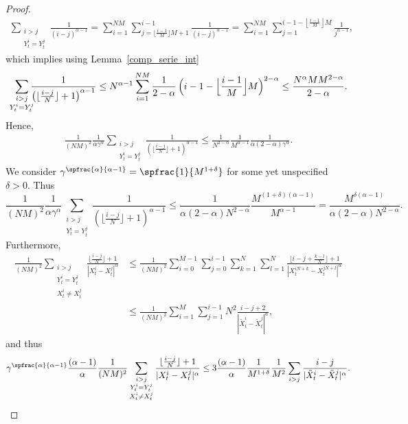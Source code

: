 \begin{proof}
\begin{gather*}
\tag*{and}
\sum_{\substack{i>j\\Y^i_t= Y^j_t}}\frac{1}{(i-j)^{\alpha-1}}=\sum_{i=1}^{NM}\sum_{j=\lfloor\frac{i-1}{M}\rfloor M+1}^{i-1}\frac{1}{(i-j)^{\alpha-1}}=\sum_{i=1}^{NM}\sum_{j=1}^{i-1-\left\lfloor\frac{i-1}{M}\right\rfloor M}\frac{1}{j^{\alpha-1}},
\end{gather*}
which implies using Lemma~\ref{comp_serie_int}\vspace*{-3pt}
\[
\sum_{\substack{i>j\\Y^i_t= Y^j_t}}\hspace*{-2mm}\frac{1}{\left(\lfloor\frac{i-j}{N}\rfloor+1\right)^{\alpha-1}}\leq N^{\alpha-1}\sum_{i=1}^{NM}\frac{1}{2-\alpha}\,\Bigl(i-1-\Bigl\lfloor\frac{i-1}{M}\Bigr\rfloor M\Bigr)^{2-\alpha}\leq \frac{N^\alpha MM^{2-\alpha}}{2-\alpha}.
\]
Hence,\vspace*{-5pt}
\begin{align*}
\frac{1}{(NM)^2}\frac{1}{\alpha\gamma^\alpha}\sum_{\substack{i>j\\Y^i_t= Y^j_t}}\frac{1}{\left(\lfloor\frac{i-j}{N}\rfloor+1\right)^{\alpha-1}}\leq\frac{1}{N^{2-\alpha}}\frac{1}{M^{\alpha-1}}\frac{1}{\alpha(2-\alpha)\gamma^\alpha}.
\end{align*}
We consider $\gamma^{\spfrac{\alpha}{\alpha-1}}=\spfrac{1}{M^{1+\delta}}$ for some yet unspecified $\delta>0$. Thus\vspace*{-3pt}
\[
\frac{1}{(NM)^2}\frac{1}{\alpha\gamma^\alpha}\sum_{\substack{i>j\\Y^i_t= Y^j_t}}\frac{1}{\left(\lfloor\frac{i-j}{N}\rfloor+1\right)^{\alpha-1}}\leq\frac{1}{\alpha(2-\alpha) N^{2-\alpha}}\frac{M^{(1+\delta)(\alpha-1)}}{M^{\alpha-1}}=\frac{M^{\delta(\alpha-1)}}{\alpha(2-\alpha) N^{2-\alpha}}.
\]
Furthermore,
\begin{align*}
\frac{1}{(NM)^2}\sum_{\substack{i>j\\Y^i_t= Y^j_t\\X^i_t\neq X^j_t}}\frac{\lfloor\frac{i-j}{N}\rfloor+1}{|X^i_t-X^j_t|^{\alpha}}
&\leq \frac{1}{(NM)^2}\sum_{i=0}^{M-1}\sum_{j=0}^{i-1}\sum_{k=1}^N\sum_{l=1}^N\frac{\lfloor i-j+\frac{k-l}{N}\rfloor+1}{|X^{iN+k}_t-X^{jN+l}_t|^{\alpha}}\\[-15pt]
&\leq \frac{1}{(NM)^2}\sum_{i=1}^{M}\sum_{j=1}^{i-1}N^2\frac{i-j+2}{|\tilde{X}^{i}_t-\tilde{X}^{j}_t|^{\alpha}},
\end{align*}
and thus
\[
\gamma^{\spfrac{\alpha}{\alpha-1}}\frac{(\alpha-1)}{\alpha}\frac{1}{(NM)^2}\sum_{\substack{i>j\\Y^i_t= Y^j_t\\X^i_t\neq X^j_t}}\frac{\lfloor\frac{i-j}{N}\rfloor+1}{|X^i_t-X^j_t|^{\alpha}}\leq 3\frac{(\alpha-1)}{\alpha}\frac{1}{M^{1+\delta}}\frac{1}{M^2}\sum_{i>j}\frac{i-j}{|\tilde{X}^{i}_t-\tilde{X}^{j}_t|^{\alpha}}.
\]
\end{proof}
